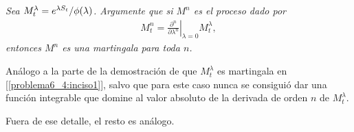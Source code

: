 \emph{
	Sea $M^\lambda_t=e^{\lambda S_t}/\phi\!\left( \lambda\right) $. Argumente que si $M^n$ es el proceso dado por
	\null
	\begin{align}
		M^n_t=\left.\frac{\partial^n}{\partial \lambda^n}\right|_{\lambda=0}M^\lambda_t,
	\end{align}
	\null
	entonces $M^n$ es una martingala para toda $n$.
}

\afterstatement\pn

Análogo a la parte de la demostración de que $M_t^\lambda$ es martingala en [\ref{problema6_4:inciso1}], salvo que para este caso
nunca se consiguió dar una función integrable que domine al valor absoluto de la derivada de orden $n$ de $M_t^\lambda$.\pn

Fuera de ese detalle, el resto es análogo.